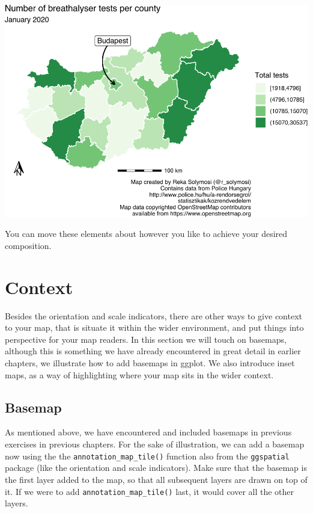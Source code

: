 \documentclass[
  krantz2]{krantz}
\begin{document}
\includegraphics{crime_mapping_files/figure-latex/scale-1.pdf}

You can move these elements about however you like to achieve your desired composition.

\hypertarget{context}{%
\section{Context}\label{context}}

Besides the orientation and scale indicators, there are other ways to give context to your map, that is situate it within the wider environment, and put things into perspective for your map readers. In this section we will touch on basemaps, although this is something we have already encountered in great detail in earlier chapters, we illustrate how to add basemaps in ggplot. We also introduce inset maps, as a way of highlighting where your map sits in the wider context.

\hypertarget{basemap}{%
\subsection{Basemap}\label{basemap}}

As mentioned above, we have encountered and included basemaps in previous exercises in previous chapters. For the sake of illustration, we can add a basemap now using the the \texttt{annotation\_map\_tile()} function also from the \texttt{ggspatial} package (like the orientation and scale indicators). Make sure that the basemap is the first layer added to the map, so that all subsequent layers are drawn on top of it. If we were to add \texttt{annotation\_map\_tile()} last, it would cover all the other layers.
\end{document}
